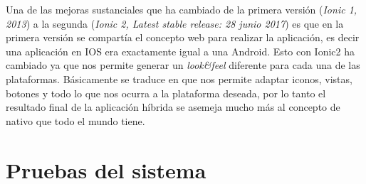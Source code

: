 

Una de las mejoras sustanciales que ha cambiado de la primera versión (\emph{Ionic 1, 2013}) a la segunda (\emph{Ionic 2, Latest stable release: 28 junio 2017}) es que en la primera versión se compartía el concepto web para realizar la aplicación, es decir una aplicación en IOS era exactamente igual a una Android. Esto con Ionic2 ha cambiado ya que nos permite generar un \emph{look\&feel} diferente para cada una de las plataformas. Básicamente se traduce en que nos permite adaptar iconos, vistas, botones y todo lo que nos ocurra a la plataforma deseada, por lo tanto el resultado final de la aplicación híbrida se asemeja mucho más al concepto de nativo que todo el mundo tiene.


\section{Pruebas del sistema}



